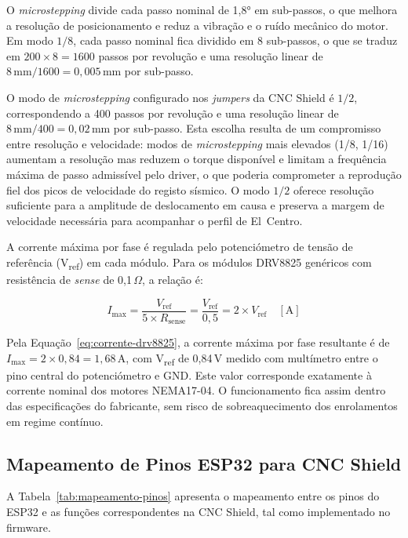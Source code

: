O \textit{microstepping} divide cada passo nominal de 1,8° em sub-passos, o que melhora a resolução de posicionamento e reduz a vibração e o ruído mecânico do motor. Em modo $1/8$, cada passo nominal fica dividido em 8 sub-passos, o que se traduz em $200 \times 8 = 1600$ passos por revolução e uma resolução linear de $8\,\text{mm} / 1600 = 0{,}005\,\text{mm}$ por sub-passo.

O modo de \textit{microstepping} configurado nos \textit{jumpers} da CNC Shield é $1/2$, correspondendo a 400 passos por revolução e uma resolução linear de $8\,\text{mm} / 400 = 0{,}02\,\text{mm}$ por sub-passo. Esta escolha resulta de um compromisso entre resolução e velocidade: modos de \textit{microstepping} mais elevados (1/8, 1/16) aumentam a resolução mas reduzem o torque disponível e limitam a frequência máxima de passo admissível pelo driver, o que poderia comprometer a reprodução fiel dos picos de velocidade do registo sísmico. O modo $1/2$ oferece resolução suficiente para a amplitude de deslocamento em causa e preserva a margem de velocidade necessária para acompanhar o perfil de El~Centro.

A corrente máxima por fase é regulada pelo potenciómetro de tensão de referência (V\textsubscript{ref}) em cada módulo. Para os módulos DRV8825 genéricos com resistência de \textit{sense} de 0,1\,$\Omega$, a relação é:

\begin{equation}
I_{\text{max}} = \frac{V_{\text{ref}}}{5 \times R_{\text{sense}}} = \frac{V_{\text{ref}}}{0{,}5} = 2 \times V_{\text{ref}} \quad [\text{A}]
\label{eq:corrente-drv8825}
\end{equation}

Pela Equação~\ref{eq:corrente-drv8825}, a corrente máxima por fase resultante é de $I_{\text{max}} = 2 \times 0{,}84 = 1{,}68$\,A, com V\textsubscript{ref} de 0,84\,V medido com multímetro entre o pino central do potenciómetro e GND. Este valor corresponde exatamente à corrente nominal dos motores NEMA17-04. O funcionamento fica assim dentro das especificações do fabricante, sem risco de sobreaquecimento dos enrolamentos em regime contínuo.


\subsection{Mapeamento de Pinos ESP32 para CNC Shield}
\label{subsec:mapeamento-pinos}

A Tabela~\ref{tab:mapeamento-pinos} apresenta o mapeamento entre os pinos do ESP32 e as funções correspondentes na CNC Shield, tal como implementado no firmware.

